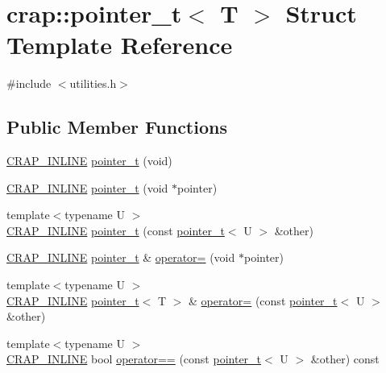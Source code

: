 \hypertarget{structcrap_1_1pointer__t}{}\section{crap\+:\+:pointer\+\_\+t$<$ T $>$ Struct Template Reference}
\label{structcrap_1_1pointer__t}


{\ttfamily \#include $<$utilities.\+h$>$}

\subsection*{Public Member Functions}
\begin{DoxyCompactItemize}
\item 
\hyperlink{config__x86_8h_a5a40526b8d842e7ff731509998bb0f1c}{C\+R\+A\+P\+\_\+\+I\+N\+L\+I\+N\+E} \hyperlink{structcrap_1_1pointer__t_a54b2fe8de0db51614313653ee94d4cda}{pointer\+\_\+t} (void)
\item 
\hyperlink{config__x86_8h_a5a40526b8d842e7ff731509998bb0f1c}{C\+R\+A\+P\+\_\+\+I\+N\+L\+I\+N\+E} \hyperlink{structcrap_1_1pointer__t_a326b4ba6bb74cade18c5c3fcc6dd6282}{pointer\+\_\+t} (void $\ast$pointer)
\item 
{\footnotesize template$<$typename U $>$ }\\\hyperlink{config__x86_8h_a5a40526b8d842e7ff731509998bb0f1c}{C\+R\+A\+P\+\_\+\+I\+N\+L\+I\+N\+E} \hyperlink{structcrap_1_1pointer__t_a0d9194463b8acd76734350740b14136a}{pointer\+\_\+t} (const \hyperlink{structcrap_1_1pointer__t}{pointer\+\_\+t}$<$ U $>$ \&other)
\item 
\hyperlink{config__x86_8h_a5a40526b8d842e7ff731509998bb0f1c}{C\+R\+A\+P\+\_\+\+I\+N\+L\+I\+N\+E} \hyperlink{structcrap_1_1pointer__t}{pointer\+\_\+t} \& \hyperlink{structcrap_1_1pointer__t_a83371114b3e9eaf97682bf0adb5b2b9a}{operator=} (void $\ast$pointer)
\item 
{\footnotesize template$<$typename U $>$ }\\\hyperlink{config__x86_8h_a5a40526b8d842e7ff731509998bb0f1c}{C\+R\+A\+P\+\_\+\+I\+N\+L\+I\+N\+E} \hyperlink{structcrap_1_1pointer__t}{pointer\+\_\+t}$<$ T $>$ \& \hyperlink{structcrap_1_1pointer__t_ac498e6bc0d4ce16023122a308ae7acb1}{operator=} (const \hyperlink{structcrap_1_1pointer__t}{pointer\+\_\+t}$<$ U $>$ \&other)
\item 
{\footnotesize template$<$typename U $>$ }\\\hyperlink{config__x86_8h_a5a40526b8d842e7ff731509998bb0f1c}{C\+R\+A\+P\+\_\+\+I\+N\+L\+I\+N\+E} bool \hyperlink{structcrap_1_1pointer__t_a16d15747fd32796e7fd8a4d2820fd019}{operator==} (const \hyperlink{structcrap_1_1pointer__t}{pointer\+\_\+t}$<$ U $>$ \&other) const 

\end{DoxyCompactItemize}
